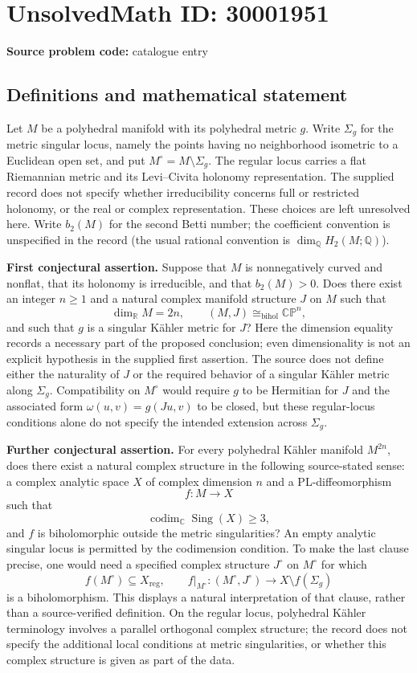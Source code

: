 \documentclass[11pt]{article}
\newcommand{\Q}{\mathbb{Q}}
\newcommand{\R}{\mathbb{R}}
\newcommand{\C}{\mathbb{C}}
\begin{document}
\section*{UnsolvedMath ID: 30001951}
\textbf{Source problem code:} catalogue entry
\subsection{Definitions and mathematical statement}
Let \(M\) be a polyhedral manifold with its polyhedral metric \(g\). Write \(\Sigma_g\) for the metric singular locus, namely the points having no neighborhood isometric to a Euclidean open set, and put \(M^\circ=M\setminus\Sigma_g\). The regular locus carries a flat Riemannian metric and its Levi--Civita holonomy representation. The supplied record does not specify whether irreducibility concerns full or restricted holonomy, or the real or complex representation. These choices are left unresolved here. Write \(b_2(M)\) for the second Betti number; the coefficient convention is unspecified in the record (the usual rational convention is \(\dim_{\Q}H_2(M;\Q)\)).

\textbf{First conjectural assertion.} Suppose that \(M\) is nonnegatively curved and nonflat, that its holonomy is irreducible, and that \(b_2(M)>0\). Does there exist an integer \(n\geq 1\) and a natural complex manifold structure \(J\) on \(M\) such that
\[
\dim_{\R}M=2n,\qquad (M,J)\cong_{\mathrm{bihol}}\mathbb{CP}^{n},
\]
and such that \(g\) is a singular K\"ahler metric for \(J\)? Here the dimension equality records a necessary part of the proposed conclusion; even dimensionality is not an explicit hypothesis in the supplied first assertion. The source does not define either the naturality of \(J\) or the required behavior of a singular K\"ahler metric along \(\Sigma_g\). Compatibility on \(M^\circ\) would require \(g\) to be Hermitian for \(J\) and the associated form \(\omega(u,v)=g(Ju,v)\) to be closed, but these regular-locus conditions alone do not specify the intended extension across \(\Sigma_g\).

\textbf{Further conjectural assertion.} For every polyhedral K\"ahler manifold \(M^{2n}\), does there exist a natural complex structure in the following source-stated sense: a complex analytic space \(X\) of complex dimension \(n\) and a PL-diffeomorphism
\[
f:M\longrightarrow X
\]
such that
\[
\operatorname{codim}_{\C}\operatorname{Sing}(X)\geq 3,
\]
and \(f\) is biholomorphic outside the metric singularities? An empty analytic singular locus is permitted by the codimension condition. To make the last clause precise, one would need a specified complex structure \(J^\circ\) on \(M^\circ\) for which
\[
f(M^\circ)\subseteq X_{\mathrm{reg}},\qquad
f|_{M^\circ}:(M^\circ,J^\circ)\longrightarrow X\setminus f(\Sigma_g)
\]
is a biholomorphism. This displays a natural interpretation of that clause, rather than a source-verified definition. On the regular locus, polyhedral K\"ahler terminology involves a parallel orthogonal complex structure; the record does not specify the additional local conditions at metric singularities, or whether this complex structure is given as part of the data.
\end{document}

